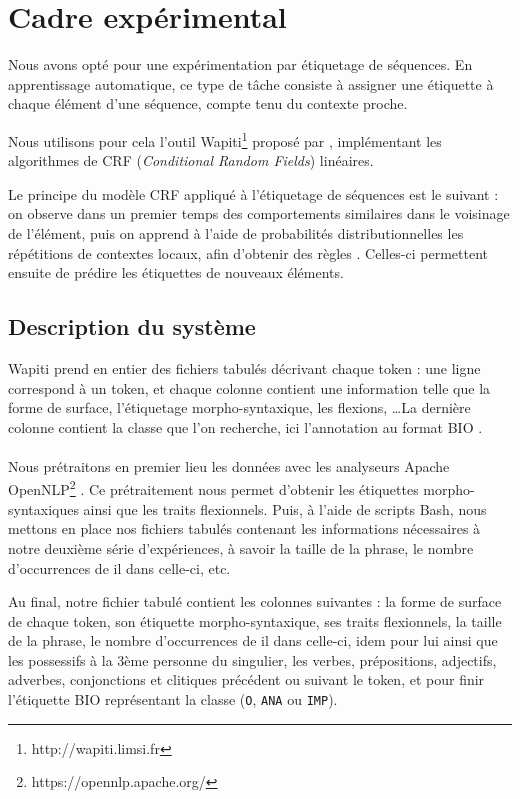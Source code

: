 \documentclass[a4paper,12pt]{article}
\begin{document}
\section{Cadre expérimental}
\label{xp}

Nous avons opté pour une expérimentation par étiquetage de séquences. En apprentissage automatique, ce type de tâche consiste à assigner une étiquette à chaque élément d'une séquence, compte tenu du contexte proche.

Nous utilisons pour cela l'outil Wapiti\footnote{http://wapiti.limsi.fr} proposé par \citet{lavergne2010practical}, implémentant les algorithmes de CRF (\textit{Conditional Random Fields}) linéaires.

Le principe du modèle CRF appliqué à l'étiquetage de séquences est le suivant : on observe dans un premier temps des comportements similaires dans le voisinage de l'élément, puis on apprend à l'aide de probabilités distributionnelles les répétitions de contextes locaux, afin d'obtenir des \og règles \fg{}. Celles-ci permettent ensuite de prédire les étiquettes de nouveaux éléments.


\subsection{Description du système}

Wapiti prend en entier des fichiers tabulés décrivant chaque token : une ligne correspond à un token, et chaque colonne contient une information telle que la forme de surface, l'étiquetage morpho-syntaxique, les flexions, \ldots La dernière colonne contient la classe que l'on recherche, ici l'annotation au format BIO .

\paragraph{}
Nous prétraitons en premier lieu les données avec les analyseurs Apache OpenNLP\footnote{https://opennlp.apache.org/} \citep{boudin-detection-taln12}. 
Ce prétraitement nous permet d'obtenir les étiquettes morpho-syntaxiques ainsi que les traits flexionnels.
Puis, à l'aide de scripts Bash, nous mettons en place nos fichiers tabulés contenant les informations nécessaires à notre deuxième série d'expériences, à savoir la taille de la phrase, le nombre d'occurrences de \og il \fg{} dans celle-ci, etc.

Au final, notre fichier tabulé contient les colonnes suivantes : la forme de surface de chaque token, son étiquette morpho-syntaxique, ses traits flexionnels, la taille de la phrase, le nombre d'occurrences de \og il \fg{} dans celle-ci, idem pour \og lui \fg{} ainsi que les possessifs à la 3ème personne du singulier, les verbes, prépositions, adjectifs, adverbes, conjonctions et clitiques précédent ou suivant le token, et pour finir l'étiquette BIO représentant la classe (\verb!O!, \verb!ANA! ou \verb!IMP!).
\end{document}
